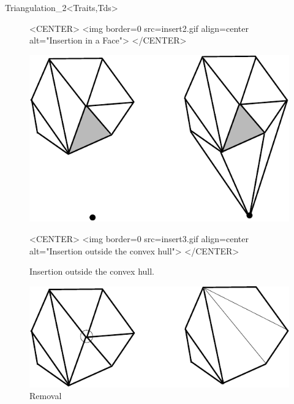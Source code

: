 \begin{ccRefClass}{Triangulation_2<Traits,Tds>}
\begin{figure}
\begin{ccHtmlOnly}
<CENTER>
<img border=0 src=insert2.gif align=center alt="Insertion in a Face">
</CENTER>
\end{ccHtmlOnly}
\end{figure}


\begin{figure}
\begin{ccTexOnly}
\begin{center}
\includegraphics{Triangulation_2/insert3}
\end{center}
\end{ccTexOnly}
\caption{Insertion outside the convex hull.
\label{Triangulation_ref_Fig_insert3}}

\begin{ccHtmlOnly}
<CENTER>
<img border=0 src=insert3.gif align=center alt="Insertion outside the
convex hull">
</CENTER>
\end{ccHtmlOnly}
\end{figure}

\begin{figure}
\begin{ccTexOnly}
\begin{center}
\includegraphics{Triangulation_2/remove}
\end{center}
\end{ccTexOnly}
\caption{Removal
\label{Triangulation_ref_Fig_remove}}


\end{figure}
\end{ccRefClass}
